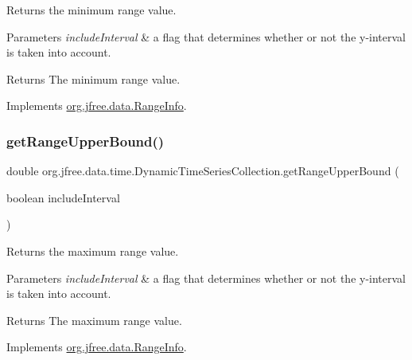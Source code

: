 Returns the minimum range value.


\begin{DoxyParams}{Parameters}
{\em include\+Interval} & a flag that determines whether or not the y-\/interval is taken into account.\\
\hline
\end{DoxyParams}
\begin{DoxyReturn}{Returns}
The minimum range value. 
\end{DoxyReturn}


Implements \mbox{\hyperlink{interfaceorg_1_1jfree_1_1data_1_1_range_info_ab0187015bbe75ca00a62a71de72c1a1d}{org.\+jfree.\+data.\+Range\+Info}}.

\mbox{\label{classorg_1_1jfree_1_1data_1_1time_1_1_dynamic_time_series_collection_ad50df36bbe93b4ac342e1dffe79f7316}} 
\subsubsection{\texorpdfstring{get\+Range\+Upper\+Bound()}{getRangeUpperBound()}}
{\footnotesize\ttfamily double org.\+jfree.\+data.\+time.\+Dynamic\+Time\+Series\+Collection.\+get\+Range\+Upper\+Bound (\begin{DoxyParamCaption}\item[{boolean}]{include\+Interval }\end{DoxyParamCaption})}

Returns the maximum range value.


\begin{DoxyParams}{Parameters}
{\em include\+Interval} & a flag that determines whether or not the y-\/interval is taken into account.\\
\hline
\end{DoxyParams}
\begin{DoxyReturn}{Returns}
The maximum range value. 
\end{DoxyReturn}


Implements \mbox{\hyperlink{interfaceorg_1_1jfree_1_1data_1_1_range_info_a85987bb398c50351d190b2b888ff3348}{org.\+jfree.\+data.\+Range\+Info}}.

